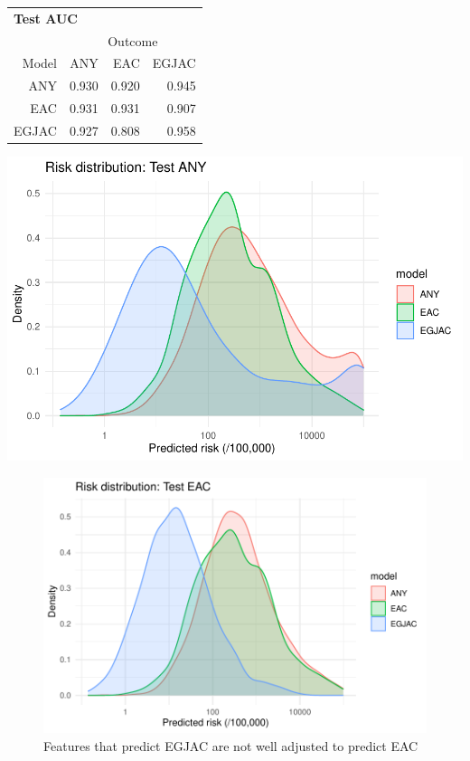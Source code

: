 \documentclass[12pt]{article}
\begin{document}
\begin{table}[ht]
\centering
\begin{tabular}{rrrr}
\toprule
  \multicolumn{4}{l}{\textbf{Test AUC}}\\
  & \multicolumn{3}{c}{Outcome}\\ \cmidrule(l){2-4}
Model & ANY & EAC & EGJAC \\ 
  \midrule
ANY & 0.930 & 0.920 & 0.945 \\ 
  EAC & 0.931 & 0.931 & 0.907 \\ 
  EGJAC & 0.927 & 0.808 & 0.958 \\ 
   \bottomrule
\end{tabular}
\end{table}
\begin{center}
\includegraphics[width=\textwidth]{figures/risk_testANY.pdf}
\end{center}

\begin{figure}
\begin{center}
\includegraphics[width=\textwidth]{figures/risk_testEAC.pdf}
\caption{Features that predict EGJAC are not well adjusted to predict EAC}
\end{center}
\end{figure}
\end{document}
